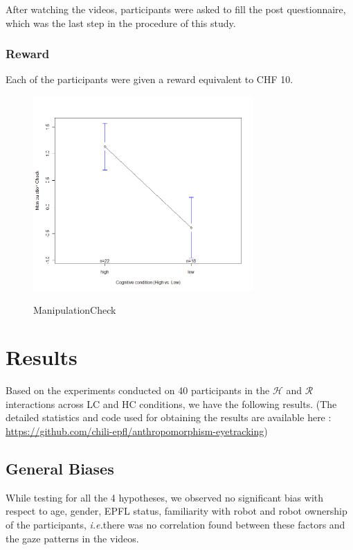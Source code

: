 \documentclass{acm_proc_article-sp}
\newcommand{\ie}{{\textit{i.e.\xspace}}}
\begin{document}
After watching the videos, participants were asked to fill the post
questionnaire, which was the last step in the procedure of this study.

\subsubsection{Reward}

Each of the participants were given a reward equivalent to CHF 10.

\begin{figure}
    {\includegraphics[width=3.3in]{ManipulationCheck}}
    \caption{ManipulationCheck}
    \label{fig:ManipulationCheck}
\end{figure}

\section{Results}

Based on the experiments conducted on 40 participants in the $\mathcal{H}$ and
$\mathcal{R}$ interactions across LC and HC conditions, we have the following
results. (The detailed statistics and code used for obtaining the results are
available here : \url{https://github.com/chili-epfl/anthropomorphism-eyetracking})

\subsection{General Biases}

While testing for all the 4 hypotheses, we observed no significant bias with
respect to age, gender, EPFL status, familiarity with robot and robot ownership
of the participants, \ie there was no correlation found between these factors
and the gaze patterns in the videos.
\end{document}
